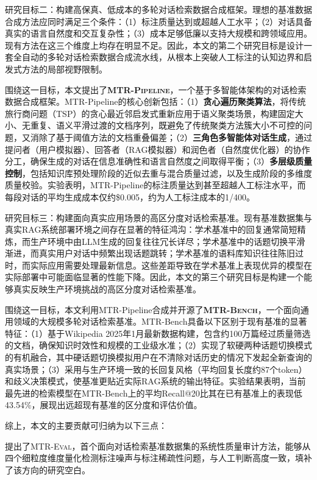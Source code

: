 研究目标二：构建高保真、低成本的多轮对话检索数据合成框架。理想的基准数据合成方法应同时满足三个条件：（1）标注质量达到或超越人工水平；（2）对话具备真实的语言自然度和交互复杂性；（3）成本足够低廉以支持大规模和跨领域应用。现有方法在这三个维度上均存在明显不足。因此，本文的第二个研究目标是设计一套全自动的多轮对话检索数据合成流水线，从根本上突破人工标注的认知边界和启发式方法的局部视野限制。

围绕这一目标，本文提出了\textbf{\textsc{MTR-Pipeline}}，一个基于多智能体架构的对话检索数据合成框架。MTR-Pipeline的核心创新包括：（1）\textbf{贪心遍历聚类算法}，将传统旅行商问题（TSP）的贪心最近邻启发式重新应用于语义聚类场景，构建固定大小、无重复、语义平滑过渡的文档序列，既避免了传统聚类方法簇大小不可控的问题，又消除了基于阈值方法的文档重叠偏差；（2）\textbf{三角色多智能体对话生成}，通过提问者（用户模拟器）、回答者（RAG模拟器）和润色者（自然度优化器）的协作分工，确保生成的对话在信息准确性和语言自然度之间取得平衡；（3）\textbf{多层级质量控制}，包括知识库预处理阶段的近似去重与混合质量过滤，以及生成阶段的多维度质量校验。实验表明，MTR-Pipeline的标注质量达到甚至超越人工标注水平，而每段对话的平均生成成本仅约\$0.005，约为人工标注成本的1/400。

研究目标三：构建面向真实应用场景的高区分度对话检索基准。现有基准数据集与真实RAG系统部署环境之间存在显著的特征鸿沟：学术基准中的回复通常简短精炼，而生产环境中由LLM生成的回复往往冗长详尽；学术基准中的话题切换平滑渐进，而真实用户对话中频繁出现话题跳转；学术基准的语料库知识往往陈旧过时，而实际应用需要处理最新信息。这些差距导致在学术基准上表现优异的模型在实际部署中可能面临显著的性能下降。因此，本文的第三个研究目标是构建一个能够真实反映生产环境挑战的高区分度对话检索基准。

围绕这一目标，本文利用MTR-Pipeline合成并开源了\textbf{\textsc{MTR-Bench}}，一个面向通用领域的大规模多轮对话检索基准。MTR-Bench具备以下区别于现有基准的显著特征：（1）基于Wikipedia 2025年1月最新数据构建，包含约100万篇经过质量筛选的文档，确保知识时效性和规模的工业级水准；（2）实现了软硬两种话题切换模式的有机融合，其中硬话题切换模拟用户在不清除对话历史的情况下发起全新查询的真实场景；（3）采用与生产环境一致的长回复风格（平均回复长度约87个token）和歧义决策模式，使基准更贴近实际RAG系统的输出特征。实验结果表明，当前最先进的检索模型在MTR-Bench上的平均Recall@20比其在已有基准上的表现低43.54\%，展现出远超现有基准的区分度和评估价值。



综上，本文的主要贡献可归纳为以下三点：

提出了\textsc{MTR-Eval}，首个面向对话检索基准数据集的系统性质量审计方法，能够从四个细粒度维度量化检测标注噪声与标注稀疏性问题，与人工判断高度一致，填补了该方向的研究空白。
    
